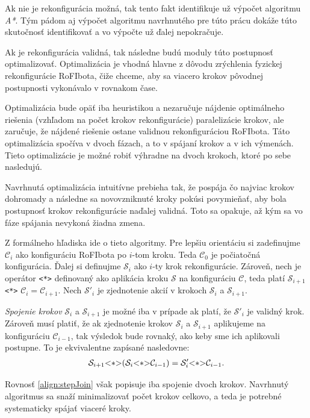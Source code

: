 \documentclass[
  digital, %
  oneside, %
  notable,   %
  lof,     %
  nolot,     %
]{fithesis3}
\begin{document}
Ak nie je rekonfigurácia možná, tak tento fakt identifikuje už výpočet algoritmu \textit{A*}. Tým pádom aj výpočet algoritmu navrhnutého pre túto prácu dokáže túto skutočnosť identifikovať a vo výpočte už ďalej nepokračuje. 

Ak je rekonfigurácia validná, tak následne budú moduly túto postupnosť optimalizovať. Optimalizácia je vhodná hlavne z dôvodu zrýchlenia fyzickej rekonfigurácie RoFIbota, čiže chceme, aby sa viacero krokov pôvodnej postupnosti vykonávalo v rovnakom čase. 

Optimalizácia bude opäť iba heuristikou a nezaručuje nájdenie optimálneho riešenia (vzhľadom na počet krokov rekonfigurácie) paralelizácie krokov, ale zaručuje, že nájdené riešenie ostane validnou rekonfiguráciou RoFIbota. Táto optimalizácia spočíva v dvoch fázach, a to v spájaní krokov a v ich výmenách. Tieto optimalizácie je možné robiť výhradne na dvoch krokoch, ktoré po sebe nasledujú. 

Navrhnutá optimalizácia intuitívne prebieha tak, že pospája čo najviac krokov dohromady a následne sa novovzniknuté kroky pokúsi povymieňať, aby bola postupnosť krokov rekonfigurácie naďalej validná. Toto sa opakuje, až kým sa vo fáze spájania nevykoná žiadna zmena. 

Z formálneho hľadiska ide o tieto algoritmy. Pre lepšiu orientáciu si zadefinujme $\mathcal{C}_i$ ako konfiguráciu RoFIbota po $i$-tom kroku. Teda $\mathcal{C}_0$ je počiatočná konfigurácia. Ďalej si definujme $\mathcal{S}_i$ ako $i$-ty krok rekonfigurácie. Zároveň, nech je operátor \lstinline{<*>} definovaný ako aplikácia kroku $\mathcal{S}$ na konfiguráciu $\mathcal{C}$, teda platí $\mathcal{S}_{i + 1}$ \lstinline{<*>} $\mathcal{C}_i = \mathcal{C}_{i + 1}$. Nech $\mathcal{S}'_i$ je zjednotenie akcií v krokoch $\mathcal{S}_i$ a $\mathcal{S}_{i + 1}$. 

\textit{Spojenie krokov} $\mathcal{S}_i$ a $\mathcal{S}_{i + 1}$ je možné iba v prípade ak platí, že $\mathcal{S}'_i$ je validný krok. Zároveň musí platiť, že ak zjednotenie krokov $\mathcal{S}_i$ a $\mathcal{S}_{i + 1}$ aplikujeme na konfiguráciu $\mathcal{C}_{i - 1}$, tak výsledok bude rovnaký, ako keby sme ich aplikovali postupne. To je ekvivalentne zapísané nasledovne: 
\begin{align}
\label{align:stepJoin}
\mathcal{S}_{i + 1} \lstinline{<*>} (\mathcal{S}_i \lstinline{<*>} \mathcal{C}_{i - 1}) = \mathcal{S}'_i \lstinline{<*>} \mathcal{C}_{i - 1}. 
\end{align}

Rovnosť \ref{align:stepJoin} však popisuje iba spojenie dvoch krokov. Navrhnutý algoritmus sa snaží minimalizovať počet krokov celkovo, a teda je potrebné systematicky spájať viaceré kroky. 
\end{document}
